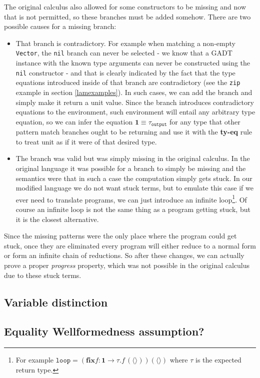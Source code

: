 The original calculus also allowed for some constructors to be missing and now that is not permitted, so these branches must be added somehow. There are two possible causes for a missing branch:

\begin{itemize}
  \item That branch is contradictory. For example when matching a non-empty \texttt{Vector}, the \texttt{nil} branch can never be selected - we know that a GADT instance with the known type arguments can never be constructed using the \texttt{nil} constructor - and that is clearly indicated by the fact that the type equations introduced inside of that branch are contradictory (see the \texttt{zip} example in section \ref{lamexamples}). In such cases, we can add the branch and simply make it return a unit value. Since the branch introduces contradictory equations to the environment, such environment will entail any arbitrary type equation, so we can infer the equation $\mathbf{1} \equiv \tau_{\texttt{output}}$ for any type that other pattern match branches ought to be returning and use it with the \textbf{ty-eq} rule to treat unit as if it were of that desired type.
  
  \item The branch was valid but was simply missing in the original calculus. In the original language it was possible for a branch to simply be missing and the semantics were that in such a case the computation simply gets stuck. In our modified language we do not want stuck terms, but to emulate this case if we ever need to translate programs, we can just introduce an infinite loop\footnote{
    For example $\texttt{loop} = (\mathbf{fix} f: \mathbf{1} \to \tau. f \, (\langle\rangle)) (\langle\rangle)$ where $\tau$ is the expected return type.
  }. Of course an infinite loop is not the same thing as a program getting stuck, but it is the closest alternative.
\end{itemize}

Since the missing patterns were the only place where the program could get stuck, once they are eliminated every program will either reduce to a normal form or form an infinite chain of reductions. So after these changes, we can actually prove a proper \textit{progress} property, which was not possible in the original calculus due to these stuck terms.

\subsection{Variable distinction}


\subsection{Equality Wellformedness assumption?}